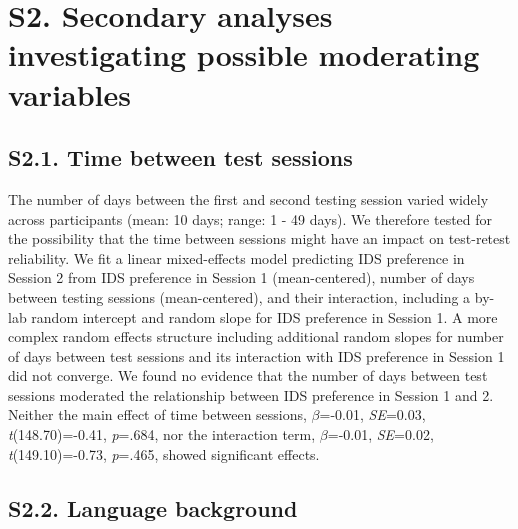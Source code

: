 \documentclass[
  man, donotrepeattitle,floatsintext]{apa6}
\begin{document}
\newpage

\hypertarget{s2.-secondary-analyses-investigating-possible-moderating-variables}{%
\section{S2. Secondary analyses investigating possible moderating variables}\label{s2.-secondary-analyses-investigating-possible-moderating-variables}}

\hypertarget{s2.1.-time-between-test-sessions}{%
\subsection{S2.1. Time between test sessions}\label{s2.1.-time-between-test-sessions}}

The number of days between the first and second testing session varied widely across participants (mean: 10 days; range: 1 - 49 days). We therefore tested for the possibility that the time between sessions might have an impact on test-retest reliability. We fit a linear mixed-effects model predicting IDS preference in Session 2 from IDS preference in Session 1 (mean-centered), number of days between testing sessions (mean-centered), and their interaction, including a by-lab random intercept and random slope for IDS preference in Session 1.
A more complex random effects structure including additional random slopes for number of days between test sessions and its interaction with IDS preference in Session 1 did not converge.
We found no evidence that the number of days between test sessions moderated the relationship between IDS preference in Session 1 and 2. Neither the main effect of time between sessions, \(\beta\)=-0.01, \emph{SE}=0.03, \emph{t}(148.70)=-0.41, \emph{p}=.684, nor the interaction term, \(\beta\)=-0.01, \emph{SE}=0.02, \emph{t}(149.10)=-0.73, \emph{p}=.465, showed significant effects.

\hypertarget{s2.2.-language-background}{%
\subsection{S2.2. Language background}\label{s2.2.-language-background}}
\end{document}
